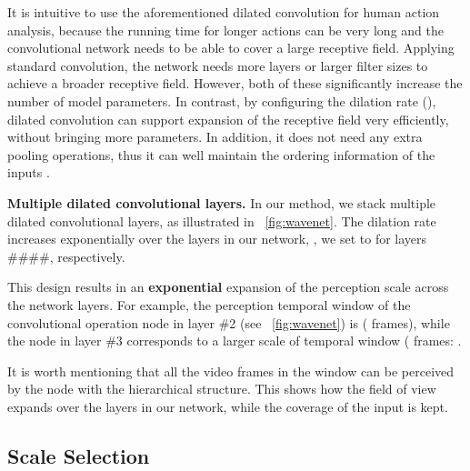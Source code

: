 \documentclass[10pt,twocolumn,letterpaper]{article}
\begin{document}
It is intuitive to use the aforementioned dilated convolution for human action analysis,
because the running time for longer actions can be very long and the convolutional network needs to be able to cover a large receptive field.
Applying standard convolution,
the network needs more layers or larger filter sizes to achieve a broader receptive field.
However, both of these significantly increase the number of model parameters.
In contrast,
by configuring the dilation rate (),
dilated convolution can support expansion of the receptive field very efficiently, without bringing more parameters.
In addition, it does not need any extra pooling operations,
thus it can well maintain the ordering information of the inputs \cite{YuKoltun2016}.


\textbf{Multiple dilated convolutional layers.}
In our method, we stack multiple dilated convolutional layers, as illustrated in \figurename{~\ref{fig:wavenet}}.
The dilation rate increases exponentially over the layers in our network,
\ie, we set  to  for layers \#\#\#\#, respectively.

This design results in an \textbf{exponential} expansion of the perception scale across the network layers.
For example,
the perception temporal window of the convolutional operation node  in layer \#2 (see \figurename{~\ref{fig:wavenet}}) is  ( frames),
while the node  in layer \#3 corresponds to a larger scale of temporal window ( frames: .



It is worth mentioning that all the video frames in the window  can be perceived by the node  with the hierarchical structure. This shows how the field of view expands over the layers in our network, while the coverage of the input is kept.







\subsection{Scale Selection}
\label{sec:method:SSS}
\end{document}
